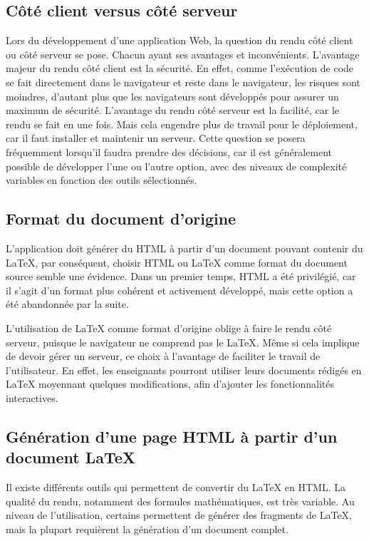 \documentclass[12pt,titlepage,oneside]{article}
\renewcommand{\footnote}[1]{}
\begin{document}
\subsection{Côté client versus côté serveur}
Lors du développement d'une application Web, la question du rendu côté client ou côté serveur se pose. Chacun ayant ses avantages et inconvénients. L'avantage majeur du rendu côté client est la sécurité. En effet, comme l'exécution de code se fait directement dans le navigateur et reste dans le navigateur, les risques sont moindres, d'autant plus que les navigateurs sont développés pour assurer un maximum de sécurité. L'avantage du rendu côté serveur est la facilité, car le rendu se fait en une fois. Mais cela engendre plus de travail pour le déploiement, car il faut installer et maintenir un serveur. Cette question se posera fréquemment lorsqu'il faudra prendre des décisions, car il est généralement possible de développer l'une ou l'autre option, avec des niveaux de complexité variables en fonction des outils sélectionnés.

\subsection{Format du document d'origine}
L'application doit générer du HTML à partir d'un document pouvant contenir du LaTeX, par conséquent, choisir HTML ou LaTeX comme format du document source semble une évidence. Dans un premier temps, HTML a été privilégié, car il s'agit d'un format plus cohérent et activement développé, mais cette option a été abandonnée par la suite\footnote{voir \nameref{AlternativesConsidérées}}.\par
L'utilisation  de LaTeX comme format d'origine oblige à faire le rendu côté serveur, puisque le navigateur ne comprend pas le LaTeX. Même si cela implique de devoir gérer un serveur, ce choix à l'avantage de faciliter le travail de l'utilisateur. En effet, les enseignants pourront utiliser leurs documents rédigés en LaTeX moyennant quelques modifications, afin d'ajouter les fonctionnalités interactives.

\newpage

\subsection{Génération d'une page HTML à partir d'un document LaTeX}
Il existe différents outils \footnote{voir \nameref{Outils}} qui permettent de convertir du LaTeX en HTML. La qualité du rendu, notamment des formules mathématiques, est très variable. Au niveau de l'utilisation, certains permettent de générer des fragments de LaTeX, mais la plupart requièrent la génération d'un document complet.\par
\end{document}
